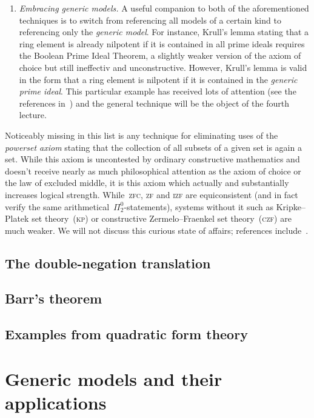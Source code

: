 \documentclass[10pt,reqno,a4paper,openany]{amsbook}
\theoremstyle{definition}
\theoremstyle{plain}
\theoremstyle{remark}
\newcommand{\?}{\,{:}\,}
\renewcommand{\_}{\mathpunct{.}\,}
\begin{document}
\begin{enumerate}
\item \emph{Embracing generic models.} A useful companion to both of the
aforementioned techniques is to switch from referencing all models of a certain
kind to referencing only the \emph{generic model}. For instance, Krull's lemma
stating that a ring element is already nilpotent if it is contained in all
prime ideals requires the Boolean Prime Ideal Theorem, a slightly weaker
version of the axiom of choice but still ineffectiv and unconstructive.
However, Krull's lemma is valid in the form that a ring element is nilpotent if
it is contained in the \emph{generic prime ideal}. This particular example has
received lots of attention (see the references
in~\cite{blechschmidt-schuster:constructive-maximal-ideals}) and the general
technique will be the object of the fourth lecture.
\end{enumerate}

Noticeably missing in this list is any technique for eliminating uses of the
\emph{powerset axiom} stating that the collection of all subsets of a given
set is again a set. While this axiom is uncontested by ordinary constructive
mathematics and doesn't receive nearly as much philosophical attention as the
axiom of choice or the law of excluded middle, it is this axiom which actually
and substantially increases logical strength. While~\textsc{zfc}, \textsc{zf}
and \textsc{izf} are equiconsistent (and in fact verify the same
arithmetical~$\Pi^0_2$-statements), systems without it such as Kripke--Platek
set theory~(\textsc{kp}) or constructive Zermelo--Fraenkel set
theory~(\textsc{czf}) are much weaker. We will not discuss this curious state
of affairs; references include~\cite{crosilla:predicativity,aczel-rathjen:cst}.


\section{The double-negation translation}

\section{Barr's theorem}

\section{Examples from quadratic form theory}


\chapter{Generic models and their applications}
\end{document}
